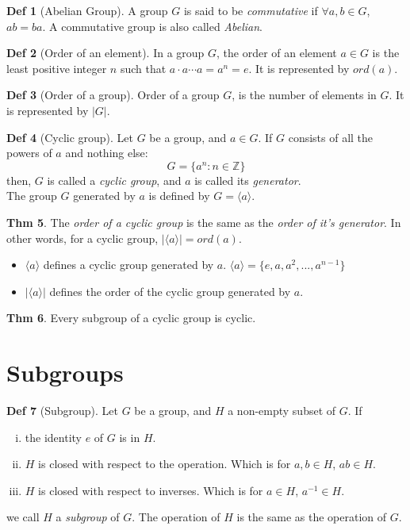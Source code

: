 \documentclass{article}
\theoremstyle{definition}
\newtheorem{definition}{Def}[section]
\newtheorem{theorem}[definition]{Thm}
\begin{document}
\begin{definition}[Abelian Group]
    A group $G$ is said to be \emph{commutative} if $\forall a, b \in G$, $ab = ba$. A commutative group is also called \emph{Abelian}.
\end{definition}

\begin{definition}[Order of an element]
    In a group $G$, the order of an element $a \in G$ is the least positive integer $n$ such that $a \cdot a \cdots a = a^n = e$. It is represented by $ord(a)$.
\end{definition}

\begin{definition}[Order of a group]
    Order of a group $G$, is the number of elements in $G$. It is represented by $|G|$.
\end{definition}

\begin{definition}[Cyclic group]
    Let $G$ be a group, and $a \in G$. If $G$ consists of all the powers of $a$ and nothing else:
    $$G = \{a^n : n \in \mathbb{Z}\}$$
    then, $G$ is called a \emph{cyclic group}, and $a$ is called its \emph{generator}.
    \\
    The group $G$ generated by $a$ is defined by $G=\langle a \rangle$.
\end{definition}

\begin{theorem}
    The \emph{order of a cyclic group} is the same as the \emph{order of it's generator}. In other words, for a cyclic group, $|\langle a \rangle | = ord(a)$.
    \begin{itemize}
	\item[] $\langle a \rangle$ defines a cyclic group generated by $a$. $\langle a \rangle = \{e, a, a^2, ..., a^{n-1}\}$
	\item[] $| \langle a \rangle |$ defines the order of the cyclic group generated by $a$.
    \end{itemize}
\end{theorem}

\begin{theorem}
Every subgroup of a cyclic group is cyclic.
\end{theorem}



\section{Subgroups}
\begin{definition}[Subgroup]
    Let $G$ be a group, and $H$ a non-empty subset of $G$. If
    \begin{enumerate}[i.]
	\item the identity $e$ of $G$ is in $H$.
	\item $H$ is closed with respect to the operation. Which is for $a, b \in H$, $ab \in H$.
	\item $H$ is closed with respect to inverses. Which is for $a \in H$, $a^{-1} \in H$.
    \end{enumerate}
    we call $H$ a \emph{subgroup} of $G$. The operation of $H$ is the same as the operation of $G$.
\end{definition}
\end{document}

